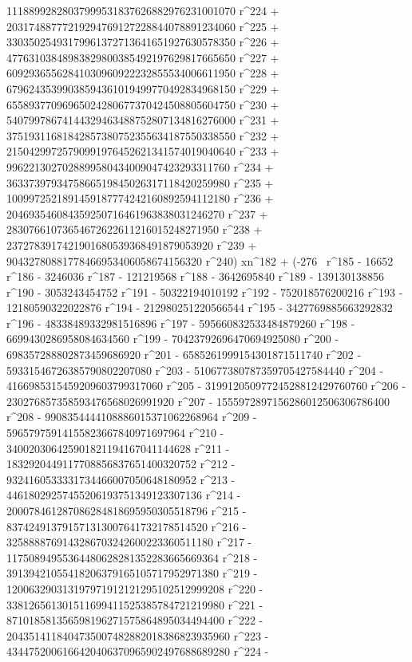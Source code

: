        11188992828037999531837626882976231001070 r^224 + 
       20317488777219294769127228844078891234060 r^225 + 
       33035025493179961372713641651927630578350 r^226 + 
       47763103848983829800385492197629817665650 r^227 + 
       60929365562841030960922232855534006611950 r^228 + 
       67962435399038594361019499770492834968150 r^229 + 
       65589377096965024280677370424508805604750 r^230 + 
       54079978674144329463488752807134816276000 r^231 + 
       37519311681842857380752355634187550338550 r^232 + 
       21504299725790991976452621341574019040640 r^233 + 
       9962213027028899580434009047423293311760 r^234 + 
       3633739793475866519845026317118420259980 r^235 + 
       1009972521891459187774242160892594112180 r^236 + 
       204693546084359250716461963838031246270 r^237 + 
       28307661073654672622611216015248271950 r^238 + 
       2372783917421901680539368491879053920 r^239 + 
       90432780881778466953406058674156320 r^240) xn^182 + (-276 \
r^185 - 16652 r^186 - 3246036 r^187 - 121219568 r^188 - 
       3642695840 r^189 - 139130138856 r^190 - 3053243454752 r^191 - 
       50322194010192 r^192 - 752018576200216 r^193 - 
       12180590322022876 r^194 - 212980251220566544 r^195 - 
       3427769885663292832 r^196 - 48338489332981516896 r^197 - 
       595660832533484879260 r^198 - 6699430286958084634560 r^199 - 
       70423792696470694925080 r^200 - 
       698357288802873459686920 r^201 - 
       6585261999154301871511740 r^202 - 
       59331546726385790802207080 r^203 - 
       510677380787359705427584440 r^204 - 
       4166985315459209603799317060 r^205 - 
       31991205097724528812429760760 r^206 - 
       230276857358593476568026991920 r^207 - 
       1555972897156286012506306786400 r^208 - 
       9908354444108886015371062268964 r^209 - 
       59657975914155823667840971697964 r^210 - 
       340020306425901821194167041144628 r^211 - 
       1832920449117708856837651400320752 r^212 - 
       9324160533331734466007050648180952 r^213 - 
       44618029257455206193751349123307136 r^214 - 
       200078461287086284818695950305518796 r^215 - 
       837424913791571313007641732178514520 r^216 - 
       3258888769143286703242600223360511180 r^217 - 
       11750894955364480628281352283665669364 r^218 - 
       39139421055418206379165105717952971380 r^219 - 
       120063290313197971912121295102512999208 r^220 - 
       338126561301511699411525385784721219980 r^221 - 
       871018581356598196271575864895034494400 r^222 - 
       2043514118404735007482882018386823935960 r^223 - 
       4344752006166420406370965902497688689280 r^224 - 
